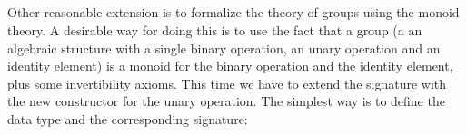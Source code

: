 \begin{code}
\noindent \>[0]\AgdaSpace{}%
\AgdaSymbol{=}\AgdaSpace{}%
\AgdaSpace{}%
\AgdaSymbol{(}\AgdaSpace{}%
\AgdaSpace{}%
\AgdaSymbol{)}\AgdaSpace{}%
\AgdaSpace{}%
\AgdaSymbol{(}\AgdaSpace{}%
\AgdaSpace{}%
\AgdaSymbol{)}\<%
\\%
\\[\AgdaEmptyExtraSkip]%
\>[0]\AgdaSpace{}%
\AgdaSymbol{:}\AgdaSpace{}%
\AgdaSpace{}%
\AgdaSpace{}%
\AgdaSymbol{(}\AgdaSpace{}%
\AgdaSpace{}%
\AgdaSpace{}%
\AgdaSpace{}%
\AgdaSpace{}%
\AgdaSpace{}%
\AgdaSpace{}%
\AgdaSpace{}%
\AgdaInductiveConstructor{[]}\AgdaSymbol{)}\<%
\\%
\>[0]\AgdaSpace{}%
\AgdaSymbol{=}\AgdaSpace{}%
\AgdaSpace{}%
\AgdaSpace{}%
\<%
\\
\end{code}

\noindent
Other reasonable extension is to formalize the theory of groups using the monoid
theory. A desirable way for doing this is to use the fact that a group (a
an algebraic structure with a single binary operation, an unary operation
and an identity element) is a monoid for the binary operation and the identity
element, plus some invertibility axioms. This time we have to extend the
signature with the new constructor for the unary operation. The simplest way
is to define the data type and the corresponding signature:

